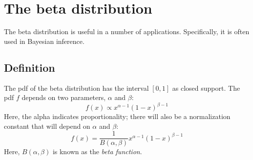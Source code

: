 \documentclass[12pt, a4paper]{article}
\begin{document}
\section{The beta distribution}
The beta distribution is useful in a number of applications. Specifically, it is often used in Bayesian inference.

\subsection{Definition}
The pdf of the beta distribution has the interval $[0,1]$ as closed support. The pdf $f$ depends on two parameters, $\alpha$ and $\beta$:
\begin{equation}
\label{pdf1}
f(x)\propto x^{\alpha-1}(1-x)^{\beta-1}
\end{equation}
Here, the alpha indicates proportionality; there will also be a normalization constant that will depend on $\alpha$ and $\beta$:
\begin{equation}
\label{pdf2}
f(x)=\frac{1}{B(\alpha,\beta)} x^{\alpha-1}(1-x)^{\beta-1}
\end{equation}
Here, $B(\alpha,\beta)$ is known as the \textit{beta function}.
\end{document}

